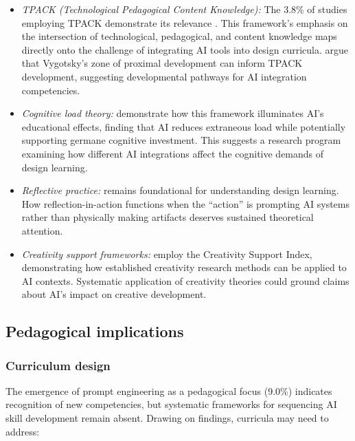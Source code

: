 \documentclass[ed]{acnsart}
\begin{document}
\begin{itemize}
	\item 
\textit{TPACK (Technological Pedagogical Content Knowledge):} The 3.8\% of studies employing TPACK demonstrate its relevance \cite{Lee2024, Bower2017}. This framework's emphasis on the intersection of technological, pedagogical, and content knowledge maps directly onto the challenge of integrating AI tools into design curricula. \citet{Polly2020} argue that Vygotsky's zone of proximal development can inform TPACK development, suggesting developmental pathways for AI integration competencies.

	\item 
\textit{Cognitive load theory:} \citet{Dong2025} demonstrate how this framework illuminates AI's educational effects, finding that AI reduces extraneous load while potentially supporting germane cognitive investment. This suggests a research program examining how different AI integrations affect the cognitive demands of design learning.

	\item 
\textit{Reflective practice:} \citet{Schon1983} remains foundational for understanding design learning. How reflection-in-action functions when the ``action'' is prompting AI systems rather than physically making artifacts deserves sustained theoretical attention.

	\item 
\textit{Creativity support frameworks:} \citet{MedelVera2025} employ the Creativity Support Index, demonstrating how established creativity research methods can be applied to AI contexts. Systematic application of creativity theories could ground claims about AI's impact on creative development.
\end{itemize}

\subsection{Pedagogical implications}

\subsubsection{Curriculum design}

The emergence of prompt engineering as a pedagogical focus (9.0\%) indicates recognition of new competencies, but systematic frameworks for sequencing AI skill development remain absent. Drawing on findings, curricula may need to address:
\end{document}
